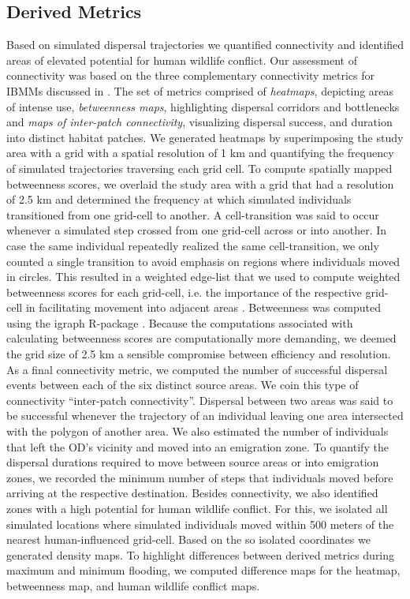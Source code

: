 \documentclass[abstract=on,10pt,a4paper,bibliography=totocnumbered]{article}
\begin{document}
\subsection{Derived Metrics}
Based on simulated dispersal trajectories we quantified connectivity and
identified areas of elevated potential for human wildlife conflict. Our
assessment of connectivity was based on the three complementary connectivity
metrics for IBMMs discussed in \cite{Hofmann.2023}. The set of metrics comprised
of \textit{heatmaps}, depicting areas of intense use, \textit{betweenness maps},
highlighting dispersal corridors and bottlenecks and \textit{maps of inter-patch
connectivity}, visualizing dispersal success, and duration into distinct habitat
patches. We generated heatmaps by superimposing the study area with a grid with
a spatial resolution of 1 km and quantifying the frequency of simulated
trajectories traversing each grid cell. To compute spatially mapped betweenness
scores, we overlaid the study area with a grid that had a resolution of 2.5 km
and determined the frequency at which simulated individuals transitioned from
one grid-cell to another. A cell-transition was said to occur whenever a
simulated step crossed from one grid-cell across or into another. In case the
same individual repeatedly realized the same cell-transition, we only counted a
single transition to avoid emphasis on regions where individuals moved in
circles. This resulted in a weighted edge-list that we used to compute weighted
betweenness scores for each grid-cell, i.e. the importance of the respective
grid-cell in facilitating movement into adjacent areas
\citep{Bastille-Rousseau.2018, Bastille-Rousseau.2021}. Betweenness was computed
using the \textsf{igraph} R-package \citep{Csardi.2006}. Because the
computations associated with calculating betweenness scores are computationally
more demanding, we deemed the grid size of 2.5 km a sensible compromise between
efficiency and resolution. As a final connectivity metric, we computed the
number of successful dispersal events between each of the six distinct source
areas. We coin this type of connectivity ``inter-patch connectivity''. Dispersal
between two areas was said to be successful whenever the trajectory of an
individual leaving one area intersected with the polygon of another area. We
also estimated the number of individuals that left the OD's vicinity and moved
into an emigration zone. To quantify the dispersal durations required to move
between source areas or into emigration zones, we recorded the minimum number of
steps that individuals moved before arriving at the respective destination.
Besides connectivity, we also identified zones with a high potential for human
wildlife conflict. For this, we isolated all simulated locations where simulated
individuals moved within 500 meters of the nearest human-influenced grid-cell.
Based on the so isolated coordinates we generated density maps. To highlight
differences between derived metrics during maximum and minimum flooding, we
computed difference maps for the heatmap, betweenness map, and human wildlife
conflict maps.
\end{document}
